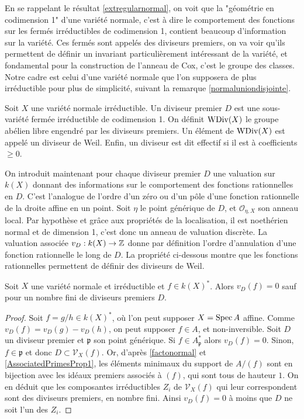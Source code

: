En se rappelant le résultat \ref{extregularnormal}, on voit que la "géométrie en codimension 1" d'une variété normale, c'est à dire le comportement des fonctions sur les fermés irréductibles de codimension 1, contient beaucoup d'information sur la variété. Ces fermés sont appelés des diviseurs premiers, on va voir qu'ils permettent de définir un invariant particulièrement intéressant de la variété, et fondamental pour la construction de l'anneau de Cox, c'est le groupe des classes. Notre cadre est celui d'une variété normale que l'on supposera de plus irréductible pour plus de simplicité, suivant la remarque \ref{normaluniondisjointe}.

\begin{defn}
Soit $X$ une variété normale irréductible. Un diviseur premier $D$ est une sous-variété fermée irréductible de codimension 1. On définit $\operatorname{WDiv}(X)$ le groupe abélien libre engendré par les diviseurs premiers. Un élément de $\operatorname{WDiv}(X)$ est appelé un diviseur de Weil. Enfin, un diviseur est dit effectif si il est à coefficients $\geq 0$. 
\end{defn}
On introduit maintenant pour chaque diviseur premier $D$ une valuation sur $k(X)$ donnant des informations sur le comportement des fonctions rationnelles en $D$. C'est l'analogue de l'ordre d'un zéro ou d'un pôle d'une fonction rationnelle de la droite affine en un point. Soit $\eta$ le point générique de $D$, et $\mathcal{O}_{\eta,X}$ son anneau local. Par hypothèse et grâce aux propriétés de la localisation, il est noethérien normal et de dimension 1, c'est donc un anneau de valuation discrète. La valuation associée $v_D:k(X)\rightarrow \mathbb{Z}$ donne par définition l'ordre d'annulation d'une fonction rationnelle le long de $D$. La propriété ci-dessous montre que les fonctions rationnelles permettent de définir des diviseurs de Weil.

\begin{prop}\label{noetherienPWDivBienDef}
Soit $X$ une variété normale et irréductible et $f\in k(X)^*$. Alors $v_D(f)=0$ sauf pour un nombre fini de diviseurs premiers $D$.
\end{prop}
\begin{proof}
Soit $f=g/h\in k(X)^*$, où l'on peut supposer $X=\operatorname{Spec} A$ affine. Comme $v_D(f)=v_D(g)-v_D(h)$, on peut supposer $f\in A$, et non-inversible. Soit $D$ un diviseur premier et $\mathfrak{p}$ son point générique. Si $f\in A_\mathfrak{p}^*$ alors $v_D(f)=0$. Sinon, $f\in \mathfrak{p}$ et donc $D \subset \mathcal{V}_X(f)$. Or, d'après \ref{factonormal} et \ref{AssociatedPrimesProp1}, les éléments minimaux du support de $A/(f)$ sont en bijection avec les idéaux premiers associés à $(f)$, qui sont tous de hauteur $1$. On en déduit que les composantes irréductibles $Z_i$ de $\mathcal{V}_X(f)$ qui leur correspondent sont des diviseurs premiers, en nombre fini. Ainsi $v_D(f)=0$ à moins que $D$ ne soit l'un des $Z_i$.
\end{proof}

